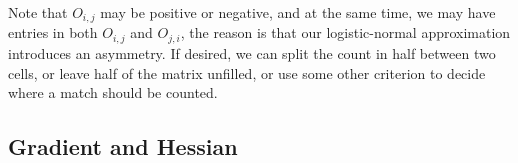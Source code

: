 \documentclass[12pt]{article}
\begin{document}
Note that $O_{i,j}$ may be positive or negative, and at the same time, we may have entries in both $O_{i,j}$ and $O_{j,i}$,
the reason is that our logistic-normal approximation introduces an asymmetry. If desired, we can split the count
in half between two cells, or leave half of the matrix unfilled, or use some other criterion to decide where a match should be counted.


\subsection{Gradient and Hessian}


\printbibliography
\end{document}
